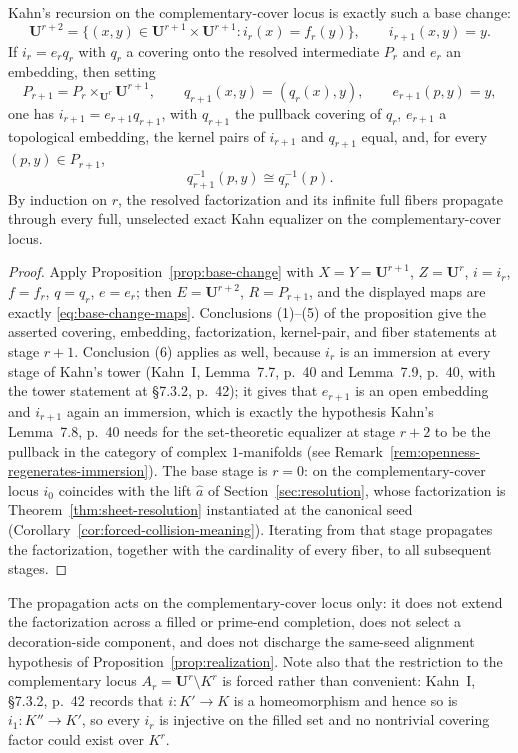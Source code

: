 \begin{corollary}\label{cor:kahn-tower}
Kahn's recursion on the complementary-cover locus is exactly such a base change:
\[
\mathbf U^{r+2}=\{(x,y)\in\mathbf U^{r+1}\times\mathbf U^{r+1}:i_r(x)=f_r(y)\},
\qquad
i_{r+1}(x,y)=y.
\]
If \(i_r=e_rq_r\) with \(q_r\) a covering onto the resolved intermediate \(P_r\) and \(e_r\) an embedding, then setting
\[
P_{r+1}=P_r\times_{\mathbf U^r}\mathbf U^{r+1},
\qquad
q_{r+1}(x,y)=(q_r(x),y),
\qquad
e_{r+1}(p,y)=y,
\]
one has \(i_{r+1}=e_{r+1}q_{r+1}\), with \(q_{r+1}\) the pullback covering of \(q_r\), \(e_{r+1}\) a topological embedding, the kernel pairs of \(i_{r+1}\) and \(q_{r+1}\) equal, and, for every \((p,y)\in P_{r+1}\),
\[
q_{r+1}^{-1}(p,y)\cong q_r^{-1}(p).
\]
By induction on \(r\), the resolved factorization and its infinite full fibers propagate through every full, unselected exact Kahn equalizer on the complementary-cover locus.
\end{corollary}

\begin{proof}
Apply Proposition~\ref{prop:base-change} with \(X=Y=\mathbf U^{r+1}\), \(Z=\mathbf U^{r}\), \(i=i_r\), \(f=f_r\), \(q=q_r\), \(e=e_r\); then \(E=\mathbf U^{r+2}\), \(R=P_{r+1}\), and the displayed maps are exactly \eqref{eq:base-change-maps}.  Conclusions (1)--(5) of the proposition give the asserted covering, embedding, factorization, kernel-pair, and fiber statements at stage \(r+1\).  Conclusion (6) applies as well, because \(i_r\) is an immersion at every stage of Kahn's tower (Kahn~I, Lemma~7.7, p.~40 and Lemma~7.9, p.~40, with the tower statement at \S7.3.2, p.~42); it gives that \(e_{r+1}\) is an open embedding and \(i_{r+1}\) again an immersion, which is exactly the hypothesis Kahn's Lemma~7.8, p.~40 needs for the set-theoretic equalizer at stage \(r+2\) to be the pullback in the category of complex \(1\)-manifolds (see Remark~\ref{rem:openness-regenerates-immersion}).  The base stage is \(r=0\): on the complementary-cover locus \(i_0\) coincides with the lift \(\widehat a\) of Section~\ref{sec:resolution}, whose factorization is Theorem~\ref{thm:sheet-resolution} instantiated at the canonical seed (Corollary~\ref{cor:forced-collision-meaning}).  Iterating from that stage propagates the factorization, together with the cardinality of every fiber, to all subsequent stages.
\end{proof}

\begin{remark}
The propagation acts on the complementary-cover locus only: it does
not extend the factorization across a filled or prime-end completion,
does not select a decoration-side component, and does not discharge
the same-seed alignment hypothesis of
Proposition~\ref{prop:realization}.  Note also that the restriction to
the complementary locus \(A_r=\mathbf U^r\setminus K^r\) is forced
rather than convenient: Kahn~I, \S7.3.2, p.~42 records that
\(i\colon K'\to K\) is a homeomorphism and hence so is
\(i_1\colon K''\to K'\), so every \(i_r\) is injective on the filled
set and no nontrivial covering factor could exist over \(K^r\).
\end{remark}